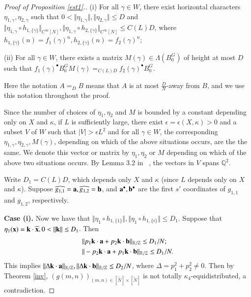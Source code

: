 \documentclass[12pt,amstex]{amsart}
\theoremstyle{definition}
\def \C {\gamma}
\def \D {\kappa}
\def \e {\epsilon}
\def \a {\bold{a}}
\def \b {\bold{b}}
\begin{document}
\begin{proof}[Proof of Proposition \ref{est1}.]

  (i) For all $\C\in W$, there exist horizontal characters $\eta_{1,\C},\eta_{2,\C}$ such that
$0<\Vert\eta_{1,\C}\Vert,\Vert\eta_{2,\C}\Vert\leq D$ and $\Vert\eta_{1,\C}\circ h_{1,\{\C\}}\Vert_{C^{\infty}[N]},\Vert\eta_{1,\C}\circ h_{2,\{\C\}}\Vert_{C^{\infty}[N]}\leq C(L)D$, where $h_{1,\{\C\}}(n)=f_{1}({\C})^{n},h_{2,\{\C\}}(n)=f_{2}({\C})^{n}$;

  (ii) For all $\C\in W$, there exists a matrix $M(\C)\in \Lambda(B_{0}^{G})$ of height at most $D$ such that $f_{1}({\C})^{\bullet}B_{0}^{G}M(\C)=_{C(L)D}f_{2}({\C})^{\bullet}B_{0}^{G}$. 

Here the notation $A=_{D}B$ means that $A$ is at most $\frac{D}{N}$-away from $B$, and we use this notation throughout the proof.

Since the number of choices of $\eta_{1},\eta_{2}$ and $M$ is bounded by a constant depending only on $X$ and $\D$,
if $L$ is sufficiently large, there exist $\e=\e(X,\D)>0$ and a subset $V$ of $W$ such that $\vert V\vert>\e L^{2}$ and for all
 $\C\in W$, the corresponding $\eta_{1,\C},\eta_{2,\C},M(\C)$, depending on which of the above 
situations occurs, are the the same. We denote this vector or matrix by $\eta_{1},\eta_{2}$ or $M$ depending on which of the above two situations occurs.
By Lemma 3.2 in ~\cite{er2}, the vectors in $V$ spans $\mathbb{Q}^{2}$.

Write $D_{1}=C(L)D$, which depends only $X$ and $\D$ (since $L$ depends only on $X$ and $\D$). Suppose $\widehat{g_{1,1}}=\a, \widehat{g_{1,2}}=\b$, and
$\a^{\bullet},\b^{\bullet}$ are the first $s'$ coordinates of $g_{1,1}$ and $g_{1,2}$, respectively.

\textbf{Case (i).} Now we have that $\Vert\eta_{1}\circ h_{1,\{1\}}\Vert,\Vert\eta_{1}\circ h_{1,\{i\}}\Vert\leq D_{1}$. Suppose that $\eta_{1}(\bold{x})=\bold{k}\cdot\widehat{\bold{x}}, 0<\Vert \bold{k}\Vert\leq D_{1}$. Then
\begin{equation}\nonumber
  \begin{split}
  &\Vert p_{1}\bold{k}\cdot\a+p_{2}\bold{k}\cdot\b\Vert_{\mathbb{R}/\mathbb{Z}}\leq D_{1}/N;
    \\& \Vert -p_{2}\bold{k}\cdot\a+p_{1}\bold{k}\cdot\b\Vert_{\mathbb{R}/\mathbb{Z}}\leq D_{1}/N.
  \end{split}
\end{equation}
This implies $\Vert \Delta\bold{k}\cdot\a\Vert_{\mathbb{R}/\mathbb{Z}}, \Vert \Delta\bold{k}\cdot\b\Vert_{\mathbb{R}/\mathbb{Z}}\leq D_{2}/N$, where $\Delta=p_{1}^{2}+p_{2}^{2}\neq 0$. Then by Theorem \ref{inv}, $(g(m,n))_{(m,n)\in[\tilde{N}]\times[\tilde{N}]}$ is not totally $\D_{4}$-equidistributed, a contradiction.


\end{proof}
\end{document}
